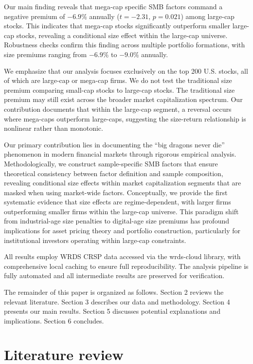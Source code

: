 \documentclass[10pt,letterpaper]{article}
\begin{document}
Our main finding reveals that mega-cap specific SMB factors command a negative premium of $-6.9\%$ annually ($t=-2.31$, $p=0.021$) among large-cap stocks. This indicates that mega-cap stocks significantly outperform smaller large-cap stocks, revealing a conditional size effect within the large-cap universe. Robustness checks confirm this finding across multiple portfolio formations, with size premiums ranging from $-6.9\%$ to $-9.0\%$ annually.

We emphasize that our analysis focuses exclusively on the top 200 U.S. stocks, all of which are large-cap or mega-cap firms. We do not test the traditional size premium comparing small-cap stocks to large-cap stocks. The traditional size premium may still exist across the broader market capitalization spectrum. Our contribution documents that within the large-cap segment, a reversal occurs where mega-caps outperform large-caps, suggesting the size-return relationship is nonlinear rather than monotonic.

Our primary contribution lies in documenting the ``big dragons never die'' phenomenon in modern financial markets through rigorous empirical analysis. Methodologically, we construct sample-specific SMB factors that ensure theoretical consistency between factor definition and sample composition, revealing conditional size effects within market capitalization segments that are masked when using market-wide factors. Conceptually, we provide the first systematic evidence that size effects are regime-dependent, with larger firms outperforming smaller firms within the large-cap universe. This paradigm shift from industrial-age size penalties to digital-age size premiums has profound implications for asset pricing theory and portfolio construction, particularly for institutional investors operating within large-cap constraints.

All results employ WRDS CRSP data accessed via the wrds-cloud library, with comprehensive local caching to ensure full reproducibility. The analysis pipeline is fully automated and all intermediate results are preserved for verification.

The remainder of this paper is organized as follows. Section 2 reviews the relevant literature. Section 3 describes our data and methodology. Section 4 presents our main results. Section 5 discusses potential explanations and implications. Section 6 concludes.

\section*{Literature review}
\end{document}
